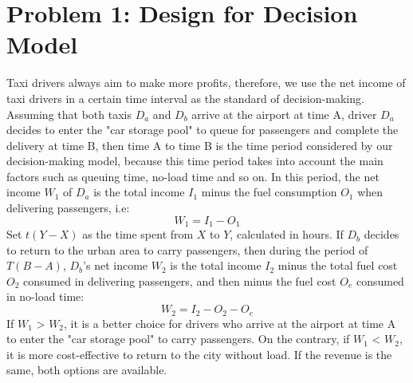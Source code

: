 \section{Problem 1: Design for Decision Model}
Taxi drivers always aim to make more profits, therefore, we use the net income of taxi drivers in a certain time interval as the standard of decision-making. Assuming that both taxis $D_{a}$ and $D_{b}$ arrive at the airport at time A, driver $D_{a}$ decides to enter the "car storage pool" to queue for passengers and complete the delivery at time B, then time A to time B is the time period considered by our decision-making model, because this time period takes into account the main factors such as queuing time, no-load time and so on. In this period, the net income $W_{1}$ of $D_{a}$ is the total income $I_{1}$ minus the fuel consumption $O_{1}$ when delivering passengers, i.e:
\begin{equation}
	W_{1}= I_{1}-O_{1} 
	\label{W_1}
\end{equation}
Set $t(Y-X)$ as the time spent from $X$ to $Y$, calculated in hours. If $D_{b}$ decides to return to the urban area to carry passengers, then during the period of $T(B-A)$, $D_{b}$'s net income $W_{2}$ is the total income $I_{2}$ minus the total fuel cost $O_{2}$ consumed in delivering passengers, and then minus the fuel cost $O_{e}$ consumed in no-load time:
\begin{equation}
	W_{2}= I_{2}-O_{2}-O_{e}
	\label{W_2}
\end{equation}
If $W_{1}$ > $W_{2}$, it is a better choice for drivers who arrive at the airport at time A to enter the "car storage pool" to carry passengers. On the contrary, if $W_{1}$ < $W_{2}$, it is more cost-effective to return to the city without load. If the revenue is the same, both options are available. 
